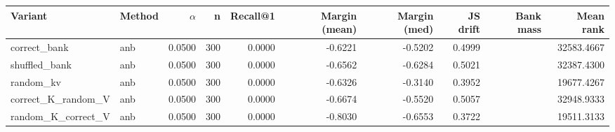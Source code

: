 \begin{tabular}{l l r r r r r r r r}
\toprule
Variant & Method & $\alpha$ & n & Recall@1 & Margin (mean) & Margin (med) & JS drift & Bank mass & Mean rank \\
\midrule
correct\_bank & anb & 0.0500 & 300 & 0.0000 & -0.6221 & -0.5202 & 0.4999 &  & 32583.4667 \\
shuffled\_bank & anb & 0.0500 & 300 & 0.0000 & -0.6562 & -0.6284 & 0.5021 &  & 32387.4300 \\
random\_kv & anb & 0.0500 & 300 & 0.0000 & -0.6326 & -0.3140 & 0.3952 &  & 19677.4267 \\
correct\_K\_random\_V & anb & 0.0500 & 300 & 0.0000 & -0.6674 & -0.5520 & 0.5057 &  & 32948.9333 \\
random\_K\_correct\_V & anb & 0.0500 & 300 & 0.0000 & -0.8030 & -0.6553 & 0.3722 &  & 19511.3133 \\
\bottomrule
\end{tabular}

